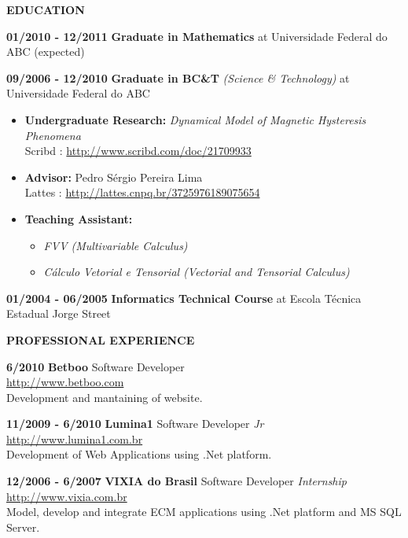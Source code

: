 \documentclass[11pt]{article}
\begin{document}
\hspace{-.29in}
	{\bf  EDUCATION }
 \begin{list}{name}{ 18em \leftmargin 1.33in \itemsep -.025in }
\item [\textbf{01/2010 - 12/2011}] {\bf Graduate in Mathematics} at Universidade Federal do ABC (expected)
\item [\textbf{09/2006 - 12/2010}] {\textbf{Graduate in BC\&T} \emph{(Science \& Technology)}} at Universidade Federal do ABC
\begin{itemize}
\vspace{-.04in}
\item  {\bf  Undergraduate Research:} {\em Dynamical Model of Magnetic Hysteresis Phenomena} \\\scriptsize Scribd : \url{http://www.scribd.com/doc/21709933} \normalsize
\hspace{-.29in}
\vspace{-.04in}
 \item {\bf  Advisor:} Pedro Sérgio Pereira Lima \\\scriptsize Lattes : \url{http://lattes.cnpq.br/3725976189075654} \normalsize
 \hspace{-.29in}
\vspace{-.04in}
 \item {\bf  Teaching Assistant:} 
 \begin{itemize}
 \vspace{-.05in}
 \item  {\textit{FVV (Multivariable Calculus)} } 
 \vspace{-.05in}
 \item  {\textit{Cálculo Vetorial e Tensorial (Vectorial and Tensorial Calculus)}} 
 \end{itemize}
\end{itemize} 

\item [\bf 01/2004 - 06/2005] {\bf Informatics Technical Course
} at Escola Técnica Estadual Jorge Street
\end{list}

\hspace{-.29in}
 {\bf  PROFESSIONAL EXPERIENCE }
 \begin{list}{name}{ 18em \leftmargin 1.33in \itemsep -.025in }
\item [\bf 6/2010] {\textbf{Betboo}} Software Developer\\
	\scriptsize \url{http://www.betboo.com} \normalsize\\
	Development and mantaining of website.
\item [\textbf{11/2009 - 6/2010}] {\textbf{Lumina1}} Software Developer \emph{Jr}\\
	\scriptsize \url{http://www.lumina1.com.br} \normalsize\\
	Development of Web Applications using .Net platform.
\item [\textbf{12/2006 - 6/2007}] {\textbf{VIXIA do Brasil}} Software Developer \emph{Internship}\\
	\scriptsize \url{http://www.vixia.com.br} \normalsize\\
	Model, develop and integrate ECM applications using .Net platform and MS SQL Server.
\end{list}
\end{document}
